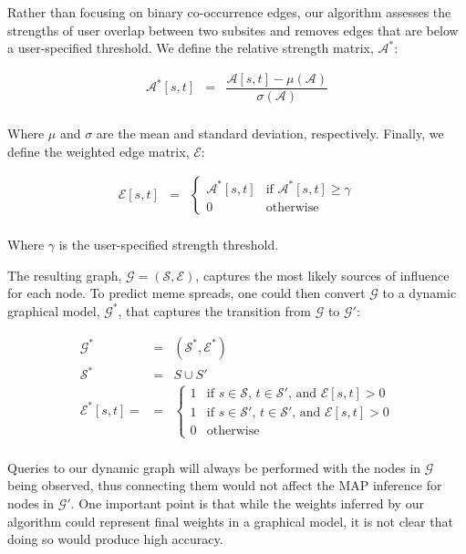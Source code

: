 \documentclass{article} %
\begin{document}
Rather than focusing on binary co-occurrence edges, our algorithm assesses the strengths of user overlap between two subsites and removes edges that are below a user-specified threshold. We define the relative strength matrix, $\mathcal{A}^*$:

$$
\begin{array}{lll}
\mathcal{A}^*[s,t] &=& \dfrac{\mathcal{A}[s,t] - \mu(\mathcal{A})}{\sigma(\mathcal{A})}\\
\end{array}
$$

Where $\mu$ and $\sigma$ are the mean and standard deviation, respectively. Finally, we define the weighted edge matrix, $\mathcal{E}$:

$$
\begin{array}{lll}
\mathcal{E}[s,t] &=& \begin{cases}\mathcal{A}^*[s,t] & \text{if }\mathcal{A}^*[s,t] \geq \gamma \\0 &\text{otherwise}\end{cases}\\
\end{array}
$$

Where $\gamma$ is the user-specified strength threshold.

The resulting graph, $\mathcal{G} = (\mathcal{S},\mathcal{E})$, captures the most likely sources of influence for each node. To predict meme spreads, one could then convert $\mathcal{G}$ to a dynamic graphical model, $\mathcal{G}^*$, that captures the transition from $\mathcal{G}$ to $\mathcal{G'}$:

$$
\begin{array}{lll}
\mathcal{G}^* &=& (\mathcal{S}^*,\mathcal{E}^*)\\
\mathcal{S}^* &=& S \cup S'\\
\mathcal{E}^*[s,t] = &=& \begin{cases}1 & \text{if } s \in \mathcal{S}\text{, }t \in \mathcal{S'} \text{, and } \mathcal{E}[s,t] > 0\\
                                      1 & \text{if } s \in \mathcal{S'}\text{, }t \in \mathcal{S'} \text{, and } \mathcal{E}[s,t] > 0\\
                                      0 & \text{otherwise}\end{cases}\\
\end{array}
$$

Queries to our dynamic graph will always be performed with the nodes in $\mathcal{G}$ being observed, thus connecting them would not affect the MAP inference for nodes in $\mathcal{G'}$. One important point is that while the weights inferred by our algorithm could represent final weights in a graphical model, it is not clear that doing so would produce high accuracy.
\end{document}
